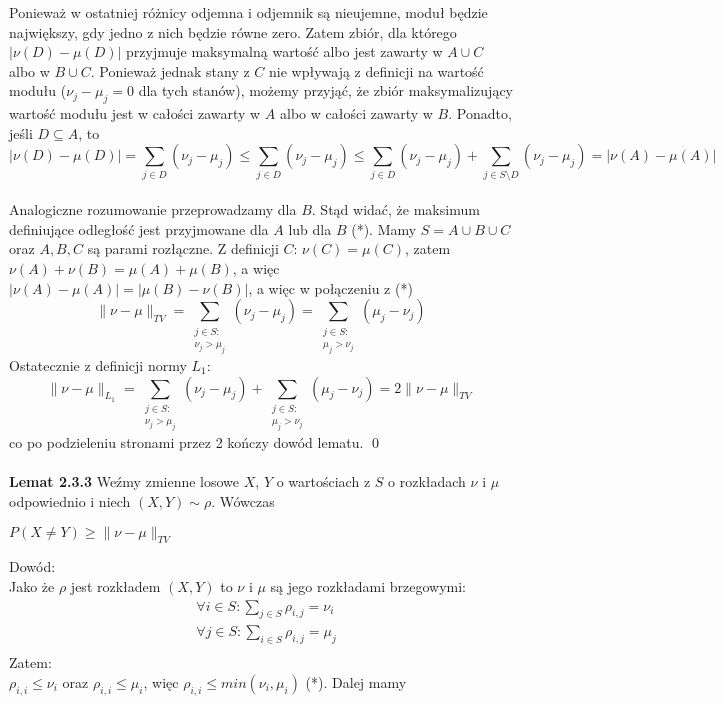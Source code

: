 \documentclass[a4paper]{article}
\begin{document}
Ponieważ w ostatniej różnicy odjemna i odjemnik są nieujemne, moduł będzie największy, gdy jedno z nich będzie równe zero. Zatem zbiór, dla którego $|\nu(D) - \mu(D)|$ przyjmuje maksymalną wartość albo jest zawarty w $A \cup C$ albo w $B \cup C$. Ponieważ jednak stany z $C$ nie wpływają z definicji na wartość modułu ($\nu_j - \mu_j = 0$ dla tych stanów), możemy przyjąć, że zbiór maksymalizujący wartość modułu jest w całości zawarty w $A$ albo w całości zawarty w $B$. Ponadto, jeśli $D \subseteq A$, to $$|\nu(D) - \mu(D)| = \sum\limits_{j \in D} (\nu_j - \mu_j) \leq \sum\limits_{j \in D} (\nu_j - \mu_j) \leq \sum\limits_{j \in D} (\nu_j - \mu_j) + \sum\limits_{j \in S \setminus D} (\nu_j - \mu_j) = |\nu(A) - \mu(A)|$$\\
Analogiczne rozumowanie przeprowadzamy dla $B$. Stąd widać, że maksimum definiujące odległość jest przyjmowane dla $A$ lub dla $B$ (*). Mamy $S = A \cup B \cup C$ oraz $A, B, C$ są parami rozłączne. Z definicji $C$: $\nu(C) = \mu(C)$, zatem $\nu(A) + \nu(B) = \mu(A) + \mu(B)$, a więc $|\nu(A) - \mu(A)| = |\mu(B) - \nu(B)|$, a więc w połączeniu z (*) $$\|\nu - \mu\|_{TV} = \sum\limits_{\substack{j \in S:\\ \nu_j > \mu_j}} (\nu_j - \mu_j) = \sum\limits_{\substack{j \in S:\\ \mu_j > \nu_j}} (\mu_j - \nu_j)$$
Ostatecznie z definicji normy $L_1$:
$$\|\nu - \mu\|_{L_1} = \sum\limits_{\substack{j \in S:\\ \nu_j > \mu_j}} (\nu_j - \mu_j) + \sum\limits_{\substack{j \in S:\\ \mu_j > \nu_j}} (\mu_j - \nu_j) = 2\|\nu - \mu\|_{TV}$$
co po podzieleniu stronami przez 2 kończy dowód lematu. \qed
\\\\
\textbf{Lemat 2.3.3}
Weźmy zmienne losowe $X$, $Y$ o wartościach z $S$ o rozkładach $\nu$ i $\mu$ odpowiednio i niech $(X, Y) \sim \rho$. Wówczas
\begin{center}
$P(X \neq Y) \geq \|\nu - \mu\|_{TV}$
\end{center}
Dowód:\\
Jako że $\rho$ jest rozkładem $(X,Y)$ to $\nu$ i $\mu$ są jego rozkładami brzegowymi:
\begin{align*}
&\forall i \in S: \sum\limits_{j \in S} \rho_{i, j} = \nu_i\\
&\forall j \in S: \sum\limits_{i \in S} \rho_{i, j} = \mu_j\\
\end{align*}
Zatem:\\
$\rho_{i, i} \leq \nu_i$ oraz $\rho_{i, i} \leq \mu_i$, więc $\rho_{i,i} \leq min(\nu_i, \mu_i)$ (*). Dalej mamy
\end{document}
